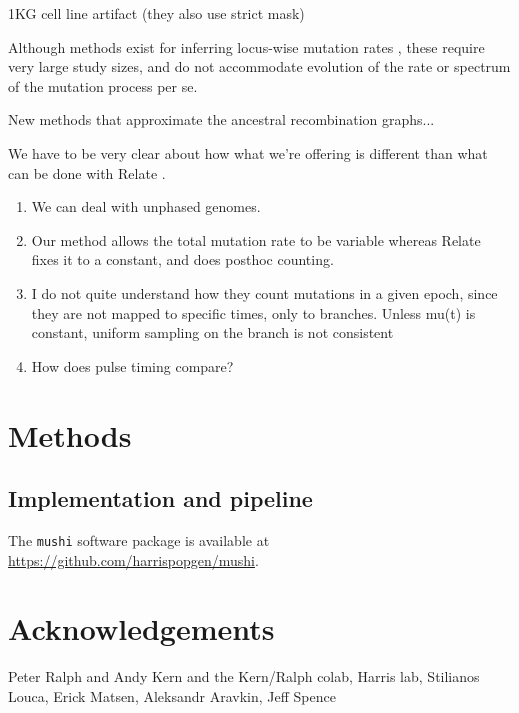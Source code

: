 \documentclass[11pt]{article}
\begin{document}

1KG cell line artifact \cite{Anderson-Trocme2019-fy} (they also use strict mask)

Although methods exist for inferring locus-wise mutation rates \cite{Bhaskar2015-bd, Nelson2012-fr}, these require very large study sizes, and do not accommodate evolution of the rate or spectrum of the mutation process per se.

New methods that approximate the ancestral recombination graphs...

We have to be very clear about how what we’re offering is different than what can be done with Relate \cite{Speidel2019-ox}.
\begin{enumerate}
\item We can deal with unphased genomes.
\item Our method allows the total mutation rate to be variable whereas Relate fixes it to a constant, and does posthoc counting.
\item I do not quite understand how they count mutations in a given epoch, since they are not mapped to specific times, only to branches.
Unless mu(t) is constant, uniform sampling on the branch is not consistent
\item How does pulse timing compare?
\end{enumerate}


\section*{Methods}\label{sec:methods}

\subsection*{Implementation and pipeline}\label{sec:methods:tool}

The \texttt{mushi} software package is available at \url{https://github.com/harrispopgen/mushi}.

\section*{Acknowledgements}\label{sec:ack}

Peter Ralph and Andy Kern and the Kern/Ralph colab, Harris lab, Stilianos Louca, Erick Matsen, Aleksandr Aravkin, Jeff Spence





\appendix

\end{document}
